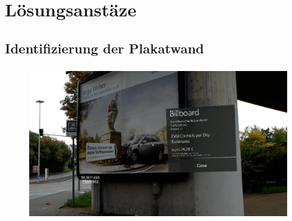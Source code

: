 \documentclass{beamer}
\begin{document}
\section{Lösungsanstäze}
\subsection{Identifizierung der Plakatwand}
\begin{frame}
    \frametitle{\insertsubsection}
    \begin{figure}
        \centering
        \begin{minipage}{0.74\linewidth}
            \centering
            \includegraphics[width=\linewidth]{images/UIWithGeolocation1}
        \end{minipage}%
        \begin{minipage}{0.24\linewidth}
            \centering

\end{minipage}
\end{figure}
\end{frame}
\end{document}
